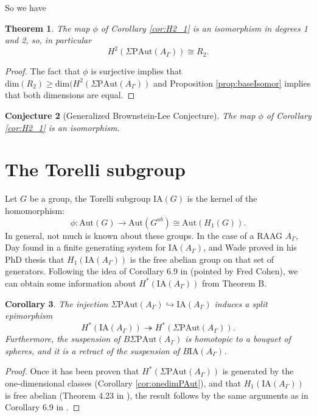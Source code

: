 \documentclass[a4paper]{amsart}
\newcommand{\G}{\Gamma}
\newcommand{\A}{{A_\Gamma}}
\newcommand{\PAut}{\Sigma\mathrm{PAut}}
\newcommand{\IA}{\mathrm{IA}}
\newtheorem{teo}{Theorem}[section]
\newtheorem{cor}[teo]{Corollary}
\newtheorem{conj}[teo]{Conjecture}
\theoremstyle{definition}
\theoremstyle{remark}
\begin{document}
So we have
\begin{teo} The map $\phi$ of Corollary  \ref{cor:H2_1} is an isomorphism in degrees 1 and 2, so, in particular
    $$
H^2(\PAut(A_\G))\cong R_2.
    $$
\end{teo}
\begin{proof}
    The fact that $\phi$ is surjective implies that $\textrm{dim}(R_2)\geq \textrm{dim}(H^2(\PAut(A_\G))$ and Proposition \ref{prop:baseIsomor} implies that both dimensions are equal.
\end{proof}

\begin{conj}[Generalized Brownstein-Lee Conjecture]
The map $\phi$ of Corollary \ref{cor:H2_1} is an isomorphism.
\end{conj}


\section{The Torelli subgroup}

Let $G$ be a group, the Torelli subgroup  $\IA(G)$  is the kernel of the  homomorphism:
$$
\phi:\mathrm{Aut}(G)\rightarrow \mathrm{Aut}(G^{ab})\cong \mathrm{Aut}(H_1(G)).
$$
In general, not much is known about these groups. In the case of a RAAG $\A$, Day found in \cite{Day}  a finite generating system for $\IA(\A)$, and Wade proved in his PhD thesis \cite{Wade} that $H_1(\IA(\A))$ is the free abelian group on that set of generators. Following the idea of Corollary 6.9 in \cite{JMcCM} (pointed by Fred Cohen), we can obtain some information about $H^*(\IA(\A))$ from Theorem B.

\begin{cor}
The injection $\PAut(\A)\hookrightarrow\IA(\A)$ induces a split epimorphism
$$
    H^*(\IA(\A)) \twoheadrightarrow H^*(\PAut(A_\G)).
    $$
Furthermore, the suspension of $B\PAut(\A)$ is homotopic to a bouquet of spheres, and it is a retract of the suspension of $B\IA(\A)$.

    \label{cor:IA}
\end{cor}


\begin{proof}
    Once it has been proven that $H^*(\PAut(\A))$ is generated by the one-dimensional classes (Corollary \ref{cor:onedimPAut}), and that $H_1(\IA(\A))$ is free abelian (Theorem 4.23 in \cite{Wade}), the result follows by the same arguments as in  Corollary 6.9 in \cite{JMcCM}.
\end{proof}
\end{document}
